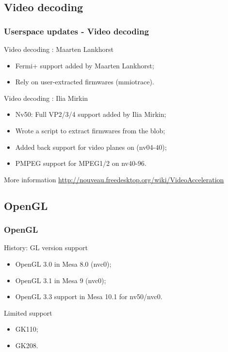\documentclass[11pt,english,compress]{beamer}
\begin{document}
\subsection{Video decoding}
\begin{frame}
	\frametitle{Userspace updates - Video decoding}

	\begin{block}{Video decoding : Maarten Lankhorst}
		\begin{itemize}
			\item Fermi+ support added by Maarten Lankhorst;
			\item Rely on user-extracted firmwares (mmiotrace).
		\end{itemize}
	\end{block}

	\begin{block}{Video decoding : Ilia Mirkin}
		\begin{itemize}
			\item Nv50: Full VP2/3/4 support added by Ilia Mirkin;
			\item Wrote a script to extract firmwares from the blob;
			\item Added back support for video planes on (nv04-40);
			\item PMPEG support for MPEG1/2 on nv40-96.
		\end{itemize}
	\end{block}

	\begin{block}{More information}
		\url{http://nouveau.freedesktop.org/wiki/VideoAcceleration}
	\end{block}
\end{frame}

\subsection{OpenGL}

\begin{frame}
	\frametitle{OpenGL}

	\begin{block}{History: GL version support}
		\begin{itemize}
			\item OpenGL 3.0 in Mesa 8.0 (nvc0);
			\item OpenGL 3.1 in Mesa 9 (nvc0);
			\item OpenGL 3.3 support in Mesa 10.1 for nv50/nvc0.
		\end{itemize}
	\end{block}

	\begin{block}{Limited support}
		\begin{itemize}
			\item GK110;
			\item GK208.
		\end{itemize}
	\end{block}
\end{frame}
\end{document}
